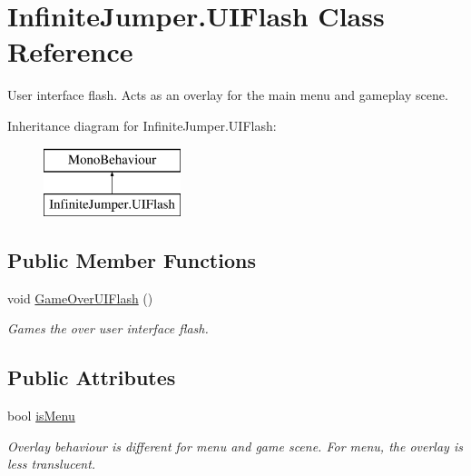 \hypertarget{class_infinite_jumper_1_1_u_i_flash}{}\section{Infinite\+Jumper.\+U\+I\+Flash Class Reference}
\label{class_infinite_jumper_1_1_u_i_flash}


User interface flash. Acts as an overlay for the main menu and gameplay scene.  


Inheritance diagram for Infinite\+Jumper.\+U\+I\+Flash\+:\begin{figure}[H]
\begin{center}
\leavevmode
\includegraphics[height=2.000000cm]{class_infinite_jumper_1_1_u_i_flash}
\end{center}
\end{figure}
\subsection*{Public Member Functions}
\begin{DoxyCompactItemize}
\item 
void \hyperlink{class_infinite_jumper_1_1_u_i_flash_ad16a264cf09a5d268d75ac2b9b890bde}{Game\+Over\+U\+I\+Flash} ()
\begin{DoxyCompactList}\small\item\em Games the over user interface flash. \end{DoxyCompactList}\end{DoxyCompactItemize}
\subsection*{Public Attributes}
\begin{DoxyCompactItemize}
\item 
bool \hyperlink{class_infinite_jumper_1_1_u_i_flash_a01ce6fee0a3f7d9d148cc42d32f52ef7}{is\+Menu}
\begin{DoxyCompactList}\small\item\em Overlay behaviour is different for menu and game scene. For menu, the overlay is less translucent. \end{DoxyCompactList}\end{DoxyCompactItemize}



